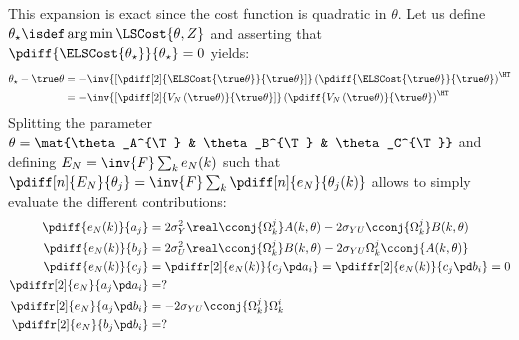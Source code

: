This expansion is exact since the cost function is quadratic in $\theta$.
Let us define ${\theta_{\star}} \isdef \arg\min \LSCost{\theta,Z}$ and asserting that $\pdiff{\ELSCost{\theta_{\star}}}{\theta_{\star}} = 0$ yields:
\begin{align}
  \theta_{\star} - \true\theta &= - \inv{\left[ \pdiff[2]{\ELSCost{\true\theta}}
                                                         {\true\theta} \right]}
                                    \left( \pdiff{\ELSCost{\true\theta}}{\true\theta} \right)^{\HT} \\
                               &= - \inv{\left[ \pdiff[2]{V_{N}\left( {\true\theta} \right)}
                                                         {\true\theta} \right]}
                                    \left( \pdiff{V_{N}\left( {\true\theta} \right) }{\true\theta} \right)^{\HT}
\end{align} 
Splitting the parameter $\theta = \mat{\theta_A^{\T} & \theta_B^{\T} & \theta_C^{\T}}$ and defining
$E_N = \inv{F}\sum_k e_N(k)$ such that $\pdiff[n]{E_N}{\theta_j} = \inv{F}\sum_k \pdiff[n]{e_N}{\theta_j(k)}$ allows to simply evaluate the different contributions:
\begin{align}
  \pdiff{e_N(k)}{a_j} 
     &= 2 \sigma_Y^2 \real \cconj{\Omega_k^j} A(k,\theta) - 2 \sigma_{YU} \cconj{\Omega_k^j} B(k,\theta) \\
  \pdiff{e_N(k)}{b_j}
     &= 2 \sigma_U^2 \real \cconj{\Omega_k^j} B(k,\theta) - 2 \sigma_{YU} \Omega_k^j \cconj{A(k,\theta)}\\
  \pdiff{e_N(k)}{c_j} &= \pdiffr[2]{e_N(k)}{c_j \pd a_i} = \pdiffr[2]{e_N(k)}{c_j \pd b_i} = 0\\
  \pdiffr[2]{e_N}{a_j \pd a_i} &= ? \\
  \pdiffr[2]{e_N}{a_j \pd b_i} &= -2 \sigma_{YU} \cconj{\Omega_k^j} \Omega_k^i \\
  \pdiffr[2]{e_N}{b_j \pd b_i} &= ? \\
\end{align}
